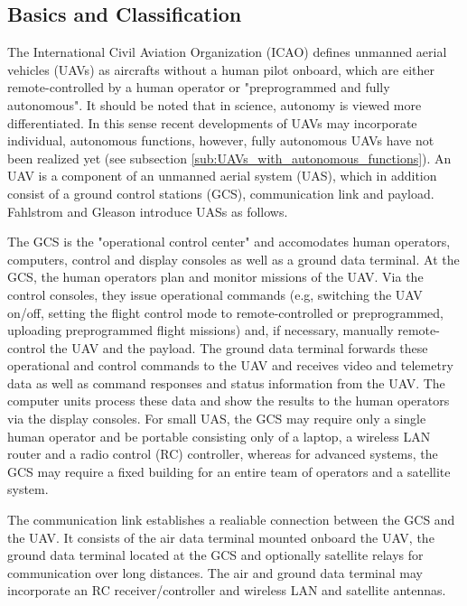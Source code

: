 \subsection{Basics and Classification} \label{sub:basics_n_classification}%
The International Civil Aviation Organization (ICAO) \cite{ICAO2005} defines unmanned aerial vehicles (UAVs) as aircrafts without a human pilot onboard,
which are either remote-controlled by a human operator or "preprogrammed and fully autonomous".
It should be noted that in science, autonomy is viewed more differentiated.
In this sense recent developments of UAVs may incorporate individual, autonomous functions, 
however, fully autonomous UAVs have not been realized yet (see subsection \ref{sub:UAVs_with_autonomous_functions}).
An UAV is a component of an unmanned aerial system (UAS), which in addition consist of a ground control stations (GCS), communication link and payload.
Fahlstrom and Gleason \cite{Fahlstrom2012} introduce UASs as follows.

The GCS is the "operational control center" and accomodates
human operators, computers, control and display consoles as well as a ground data terminal.
At the GCS, the human operators plan and monitor missions of the UAV. 
Via the control consoles, they issue operational commands 
(e.g, switching the UAV on/off, setting the flight control mode to remote-controlled or preprogrammed, uploading preprogrammed flight missions) 
and, if necessary, manually remote-control the UAV and the payload.
The ground data terminal forwards these operational and control commands to the UAV and
receives video and telemetry data as well as command responses and status information from the UAV.
The computer units process these data and show the results to the human operators via the display consoles.
For small UAS, the GCS may require only a single human operator and be portable consisting only of a laptop, a wireless LAN router and a radio control (RC) controller,
whereas for advanced systems, the GCS may require a fixed building for an entire team of operators and a satellite system.

The communication link establishes a realiable connection between the GCS and the UAV. 
It consists of the air data terminal mounted onboard the UAV, the ground data terminal located at the GCS and 
optionally satellite relays for communication over long distances. 
The air and ground data terminal may incorporate an RC receiver/controller and wireless LAN and satellite antennas. 

